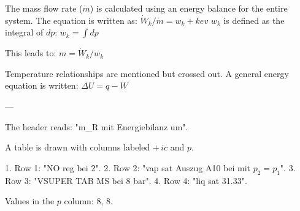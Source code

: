 The mass flow rate (\( \dot{m} \)) is calculated using an energy balance for the entire system.  
The equation is written as:  
\( \dot{W}_k / \dot{m} = w_k + kev \)  
\( w_k \) is defined as the integral of \( dp \):  
\( w_k = \int dp \)  

This leads to:  
\( \dot{m} = \dot{W}_k / w_k \)  

Temperature relationships are mentioned but crossed out.  
A general energy equation is written:  
\( \Delta U = q - W \)  

---

The header reads: "m_R mit Energiebilanz um".  

A table is drawn with columns labeled \( + \, ic \) and \( p \).  

1. Row 1: "NO reg bei 2".  
2. Row 2: "vap sat Auszug A10 bei mit \( p_2 = p_1 \)".  
3. Row 3: "VSUPER TAB MS bei 8 bar".  
4. Row 4: "liq sat 31.33".  

Values in the \( p \) column: \( 8 \), \( 8 \).